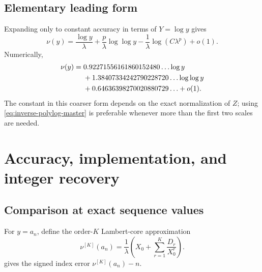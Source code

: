 \documentclass[11pt,a4paper,oneside,openany]{book}
\theoremstyle{definition}
\theoremstyle{remark}
\begin{document}
\section{Elementary leading form}
Expanding only to constant accuracy in terms of $Y=\log y$ gives
\begin{equation}
 \nu(y)=\frac{\log y}{\lambda}
 +\frac{p}{\lambda}\log\log y
 -\frac1\lambda\log(C\lambda^p)+o(1).
 \label{eq:inverse-leading-elementary}
\end{equation}
Numerically,
\begin{align}
 \nu(y)={}&0.92271556161860152480\ldots\log y\notag\\
 &+1.38407334242790228720\ldots\log\log y\notag\\
 &+0.64636398270020880729\ldots+o(1).
 \label{eq:inverse-leading-numeric}
\end{align}
The constant in this coarser form depends on the exact normalization of $Z$;
using \cref{eq:inverse-polylog-master} is preferable whenever more than the
first two scales are needed.

\chapter{Accuracy, implementation, and integer recovery}
\label{ch:inverse-practical}

\section{Comparison at exact sequence values}
For $y=a_n$, define the order-$K$ Lambert-core approximation
\begin{equation}
 \nu^{[K]}(a_n)=\frac1\lambda
 \left(X_0+\sum_{r=1}^{K}\frac{D_r}{X_0^r}\right).
 \label{eq:inverse-truncation}
\end{equation}
 gives the signed index error
$\nu^{[K]}(a_n)-n$.
\end{document}
